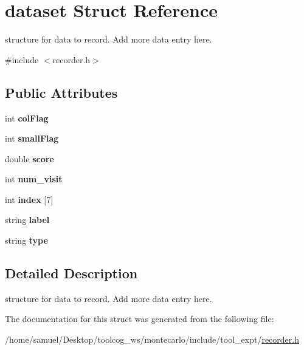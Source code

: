 \hypertarget{structdataset}{}\section{dataset Struct Reference}
\label{structdataset}


structure for data to record. Add more data entry here.  




{\ttfamily \#include $<$recorder.\+h$>$}

\subsection*{Public Attributes}
\begin{DoxyCompactItemize}
\item 
\mbox{\label{structdataset_a18ad09e1e8d828bb47c9c97ba8fb19ff}} 
int {\bfseries col\+Flag}
\item 
\mbox{\label{structdataset_a538895328f6fdcdf1961886b9b87ef4a}} 
int {\bfseries small\+Flag}
\item 
\mbox{\label{structdataset_a99b024d8545e437d501de41972cc7f78}} 
double {\bfseries score}
\item 
\mbox{\label{structdataset_adb82f6ebc39f6b4bcd76da5b4351d459}} 
int {\bfseries num\+\_\+visit}
\item 
\mbox{\label{structdataset_a2b08b466539366cbeac52c06e282bb13}} 
int {\bfseries index} \mbox{[}7\mbox{]}
\item 
\mbox{\label{structdataset_a8fc49f276f433cc35ca1444154ea7bad}} 
string {\bfseries label}
\item 
\mbox{\label{structdataset_a288f4d9ae8fdb1df154d5766cf6d878c}} 
string {\bfseries type}
\end{DoxyCompactItemize}


\subsection{Detailed Description}
structure for data to record. Add more data entry here. 

The documentation for this struct was generated from the following file\+:\begin{DoxyCompactItemize}
\item 
/home/samuel/\+Desktop/toolcog\+\_\+ws/montecarlo/include/tool\+\_\+expt/\hyperlink{recorder_8h}{recorder.\+h}\end{DoxyCompactItemize}
